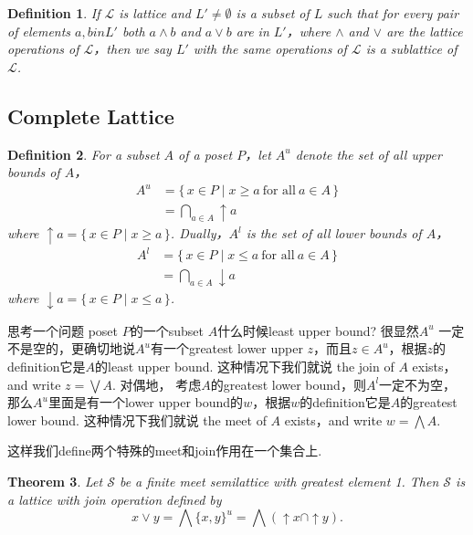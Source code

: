 \documentclass{article}
\newtheorem{theorem}{Theorem}[section]
\newtheorem{definition}[theorem]{Definition}
\newcommand\Set[2]{\{\,#1\mid#2\,\}} %
\newcommand\slattice{\mathcal{S}}
\newcommand\lattice{\mathcal{L}}
\begin{document}
\begin{definition}
\rm If $\lattice$ is lattice and $L' \neq \emptyset$ is a subset of $L$ such that for every pair of elements $a,b in L'$ both $a \wedge b$ and $a \vee b$ are in $L'$，where $\wedge$ and $\vee$ are the lattice operations of $\lattice$，then we say $L'$ with the same operations of $\lattice$ is a {\color{red} sublattice} of $\lattice$. 
\end{definition}

\newpage
\subsection{Complete Lattice}
\begin{definition}
\rm For a subset $A$ of a poset $P$，let $A^u$ denote the set of all upper bounds of $A$，
$$
\begin{aligned}
A^u &= \Set{x \in P}{x \geq a\ \text{for all}\ a \in A} \\
	&= \bigcap\limits_{a \in A} \uparrow a
\end{aligned}
$$
where $\uparrow a = \Set{x \in P}{x \geq a}$. Dually，$A^l$ is the set of all lower bounds of $A$，
$$
\begin{aligned}
A^l &= \Set{x \in P}{x \leq a\ \text{for all}\ a \in A} \\
	&= \bigcap\limits_{a \in A} \downarrow a
\end{aligned}	
$$
where $\downarrow a = \Set{x \in P}{x \leq a}$.
\end{definition}

思考一个问题{\color{red} poset $P$的一个subset $A$什么时候least upper bound}? 很显然$A^u$ 一定不是空的，更确切地说$A^u$有一个greatest lower upper $z$，而且$z \in A^u$，根据$z$的definition它是$A$的least upper bound. 这种情况下我们就说{\color{red} the join of $A$ exists，and write $z = \bigvee A$}. 对偶地，{\color{red} 考虑$A$的greatest lower bound}，则$A^l$一定不为空，那么$A^u$里面是有一个lower upper bound的$w$，根据$w$的definition它是$A$的greatest lower bound. 这种情况下我们就说{\color{red} the meet of $A$ exists，and write $w = \bigwedge A$}.

{\color{blue} 这样我们define两个特殊的meet和join作用在一个集合上}.

\begin{theorem}
\rm Let $\slattice$ be a finite meet semilattice with greatest element 1. Then $\slattice$ is a lattice with join operation defined by 
$$
x \vee y = \bigwedge \{x,y\} ^u = \bigwedge (\uparrow x \cap \uparrow y).
$$
\end{theorem}
\end{document}
